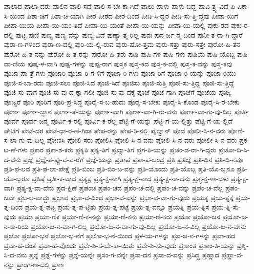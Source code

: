 {ಪಾಲಾದ
ಪಾಲಾ-ದರು
ಪಾಲಿನ
ಪಾಲಿ-ಸದೆ
ಪಾಲಿ-ಸ-ಬೇ-ಕಾ-ಗಿದೆ
ಪಾಲು
ಪಾಳು
ಪಾಳು-ಬಿದ್ದ
ಪಾವಿ-ತ್ರ್ಯ-ವಿದೆ
ಪಿ
ಪಿಕಾ-ಸಿ-ಯಿಂದ
ಪಿಶಾ-ಚಿಗೆ
ಪಿಶಾ-ಚಿ-ಯಾಗಿ
ಪೀಠ
ಪೀಠದ
ಪೀಠ-ದಿಂದ
ಪೀಡಿ-ಸಿ-ದ್ದರ
ಪೀಡಿ-ಸು-ತ್ತಿ-ದ್ದವು
ಪೀಪಾ-ಯಿಗೆ
ಪೀಪಾ-ಯಿಯ
ಪೀಪಾ-ಯಿ-ಯಂ-ತಿದೆ
ಪೀಪಾ-ಯಿ-ಯಂತೆ
ಪೀಪಾ-ಯಿ-ಯನ್ನು
ಪೀಪಾ-ಯಿ-ಯಲ್ಲಿ
ಪುಕು-ರದ
ಪುಕು-ರ-ದಲ್ಲಿ
ಪುಟ್ಟ
ಪುಣಿ
ಪುಣ್ಯ
ಪುಣ್ಯ-ವನ್ನು
ಪುಣ್ಯ-ವಿದೆ
ಪುಣ್ಯಾ-ತ್ಮ-ರಿಲ್ಲ
ಪುನಃ
ಪುನ-ರ್ಜ-ನ್ಮ-ದಿಂದ
ಪುನೀ-ತ-ರಾ-ಗಿ-ದ್ದಾರೆ
ಪುರಾ-ಣ-ಗಳಿಂದ
ಪುರಾ-ಣ-ದಲ್ಲಿ
ಪುರಿ-ಯ-ಲ್ಲಿ-ರುವ
ಪುರು-ಷೋ-ತ್ತಮ
ಪುರು-ಸತ್ತು
ಪುರು-ಸತ್ತೇ
ಪುರೋ-ಹಿ-ತನ
ಪುರೋ-ಹಿ-ತ-ನನ್ನು
ಪುರೋ-ಹಿ-ತ-ರನ್ನು
ಪುರೋ-ಹಿ-ತರು
ಪುಷಿ
ಪುಷಿ-ಗಳ
ಪುಷಿ-ಗಳು
ಪುಷಿಯ
ಪುಷಿ-ಯೊಬ್ಬ
ಪುಷಿ-ವಾ-ಣಿಯ
ಪುಷ್ಕ-ಳ-ವಾಗಿ
ಪುಷ್ಪ-ಗಳನ್ನು
ಪುಷ್ಪ-ರಾಗ
ಪುಸ್ತಕ
ಪುಸ್ತ-ಕದ
ಪುಸ್ತ-ಕ-ದಲ್ಲಿ
ಪುಸ್ತ-ಕ-ವನ್ನು
ಪುಸ್ತ-ಕವು
ಪೂಜಾ-ಪಾ-ತ್ರೆ-ಗಳು
ಪೂಜಾರಿ
ಪೂಜಾ-ರಿ-ಗ-ಳಿಗೆ
ಪೂಜಾ-ರಿ-ಗಳು
ಪೂಜಾ-ರಿಗೆ
ಪೂಜಾ-ರಿ-ಯನ್ನು
ಪೂಜಾ-ರಿಯು
ಪೂಜಿ-ಸ-ಬಾ-ರದು
ಪೂಜಿ-ಸಲು
ಪೂಜಿ-ಸಿದ
ಪೂಜಿ-ಸಿದೆ
ಪೂಜಿಸು
ಪೂಜಿ-ಸುತ್ತಿ
ಪೂಜಿ-ಸು-ತ್ತಿದ್ದ
ಪೂಜಿ-ಸು-ತ್ತಿದ್ದೆ
ಪೂಜಿ-ಸು-ವಾಗ
ಪೂಜಿ-ಸು-ವು-ದ-ಕ್ಕಾ-ಗಲೀ
ಪೂಜಿ-ಸು-ವು-ದಕ್ಕೆ
ಪೂಜೆ
ಪೂಜೆ-ಗಾಗಿ
ಪೂಜೆಗೆ
ಪೂಜೆಯ
ಪೂಜ್ಯ
ಪೂಜ್ಯರೆ
ಪೂರಿ
ಪೂರಿಗೆ
ಪೂರಿ-ಪ್ರ-ಸಿದ್ಧ
ಪೂರೈ-ಸ-ಬ-ಹುದು
ಪೂರೈ-ಸ-ಬೇಕು
ಪೂರೈ-ಸಿ-ಕೊಂಡ
ಪೂರೈ-ಸಿ-ರ-ಬೇಕು
ಪೂರ್ಣ
ಪೂರ್ಣ-ಜ್ಞಾನ
ಪೂರ್ಣ-ತೆ-ಯನ್ನು
ಪೂರ್ಣ-ವಾಗಿ
ಪೂರ್ಣ-ವಾ-ಗಿ-ರು-ವನು
ಪೂರ್ಣ-ವಾ-ಗು-ವು-ದಿಲ್ಲ
ಪೂರ್ತಿ
ಪೂರ್ವ
ಪೂರ್ವ-ಜನ್ಮ
ಪೂರ್ವಿ-ಕ-ರಲ್ಲಿ
ಪೂರ್ವಿ-ಕ-ರೆಲ್ಲ
ಪೆಟ್ಟಿ-ಗೆ-ಯನ್ನು
ಪೆಟ್ಟಿ-ಗೆ-ಯ-ಲ್ಲಿತ್ತು
ಪೆಟ್ಟಿ-ಗೆ-ಯ-ಲ್ಲಿದೆ
ಪೇಟೆಗೆ
ಪೇಟೆ-ದರ
ಪೇಟೆ-ಧಾ-ರ-ಣೆ-ಗಿಂತ
ಪೇಪ-ರನ್ನು
ಪೇಪ-ರಿ-ನಲ್ಲಿ
ಪೈಲ್ವಾನ್
ಪೊದೆ
ಪೊಲೀ-ಸಿ-ನ-ವರು
ಪೋಣಿ-ಸ-ಲಾ-ಗು-ವು-ದಿಲ್ಲ
ಪೋಣಿಸಿ
ಪೋಲಿ-ಸರು
ಪೋಲಿಸಿ
ಪೋಲಿ-ಸಿ-ನ-ವನು
ಪೋಲಿ-ಸಿ-ನ-ವರು
ಪೋಲೀ-ಸಿ-ನ-ವರು
ಪ್ರಕ-ಟ-ಣೆ-ಗಳು
ಪ್ರಕಾರ
ಪ್ರಕಾ-ಶ-ಕರು
ಪ್ರಕೃತಿ
ಪ್ರಕೃ-ತಿಗೆ
ಪ್ರಖ್ಯಾ-ತಿಗೆ
ಪ್ರಗ-ತಿ-ಯನ್ನು
ಪ್ರಚಂ-ಡ-ರಾ-ಗಿ-ದ್ದರು
ಪ್ರಚೋ-ದಿ-ಸಿ-ದ-ವನು
ಪ್ರಜ್ಞೆ
ಪ್ರಜ್ಞೆ-ತ-ಪ್ಪು-ವ-ವ-ರೆಗೆ
ಪ್ರಜ್ಞೆ-ಯನ್ನು
ಪ್ರತಾಪ
ಪ್ರತಾ-ಪ-ಚಂದ್ರ
ಪ್ರತಿ
ಪ್ರತಿಜ್ಞೆ
ಪ್ರತಿ-ದಿನ
ಪ್ರತಿ-ದಿ-ನವೂ
ಪ್ರತಿ-ಫ-ಲವ
ಪ್ರತಿ-ಫ-ಲಾ-ಪೇಕ್ಷೆ
ಪ್ರತಿ-ಬಿಂಬ
ಪ್ರತಿ-ಬಿಂ-ಬ-ವನ್ನು
ಪ್ರತಿ-ಯೊಂದು
ಪ್ರತಿ-ಯೊಬ್ಬ
ಪ್ರತಿ-ಯೊ-ಬ್ಬನೂ
ಪ್ರತಿ-ಯೊ-ಬ್ಬರೂ
ಪ್ರತಿಷ್ಠೆ
ಪ್ರತೀ-ಕ-ವಾದ
ಪ್ರತ್ಯಕ್ಷ
ಪ್ರತ್ಯ-ಕ್ಷ-ನಾಗಿ
ಪ್ರತ್ಯ-ಕ್ಷ-ನಾದ
ಪ್ರತ್ಯ-ಕ್ಷ-ನಾ-ದನು
ಪ್ರತ್ಯ-ಕ್ಷ-ಳಾ-ದಳು
ಪ್ರತ್ಯ-ಕ್ಷ-ವಾಗಿ
ಪ್ರತ್ಯ-ಕ್ಷ-ವಾ-ದೆನು
ಪ್ರದ-ಕ್ಷಿಣೆ
ಪ್ರಪಂಚ
ಪ್ರಪಂ-ಚದ
ಪ್ರಪಂ-ಚ-ದಲ್ಲಿ
ಪ್ರಪಂ-ಚ-ವನ್ನು
ಪ್ರಪಂ-ಚ-ವೆಲ್ಲ
ಪ್ರಪಂ-ಚವೇ
ಪ್ರಬ-ಲ-ವಾದ್ದು
ಪ್ರಭಾವ
ಪ್ರಭಾ-ವ-ದಿಂದ
ಪ್ರಭಾ-ವ-ವನ್ನು
ಪ್ರಭಾ-ವ-ವಾ-ಗು-ವುದು
ಪ್ರಯತ್ನ
ಪ್ರಯ-ತ್ನಕ್ಕೆ
ಪ್ರಯ-ತ್ನ-ದಿಂದ
ಪ್ರಯ-ತ್ನ-ಪಟ್ಟ
ಪ್ರಯ-ತ್ನ-ಪ-ಟ್ಟಿತು
ಪ್ರಯ-ತ್ನ-ಪಟ್ಟೆ
ಪ್ರಯ-ತ್ನ-ವನ್ನೂ
ಪ್ರಯತ್ನಿ
ಪ್ರಯ-ತ್ನಿಸ
ಪ್ರಯ-ತ್ನಿ-ಸು-ವುದು
ಪ್ರಯಾ
ಪ್ರಯಾ-ಣಿಕ
ಪ್ರಯಾ-ಣಿ-ಕ-ನನ್ನು
ಪ್ರಯಾ-ಣಿ-ಕನು
ಪ್ರಯಾ-ಣಿ-ಕರು
ಪ್ರಯೋ
ಪ್ರಯೋ-ಜನ
ಪ್ರಯೋ-ಜ-ನ-ಕಾ-ರಿಯ
ಪ್ರಯೋ-ಜ-ನ-ವಾ-ಗ-ಲಿಲ್ಲ
ಪ್ರಯೋ-ಜ-ನ-ವಾ-ಗು-ವು-ದಿಲ್ಲ
ಪ್ರಯೋ-ಜ-ನ-ವಿಲ್ಲ
ಪ್ರಯೋ-ಜ-ನ-ವೇನು
ಪ್ರಲೋ
ಪ್ರಲೋ-ಭನೆ
ಪ್ರಲೋ-ಭ-ನೆಗೆ
ಪ್ರಲೋ-ಭ-ನೆ-ಯಿಂದ
ಪ್ರಳ-ಯ-ಗಳನ್ನು
ಪ್ರವ-ಚ-ನ-ಗಳನ್ನು
ಪ್ರವಾ-ಹದ
ಪ್ರವಾ-ಹ-ದಂತೆ
ಪ್ರವಾ-ಹ-ವೊಂದು
ಪ್ರವೇ-ಶಿ-ಸ-ಬೇ-ಕಾ-ಯಿತು
ಪ್ರವೇ-ಶಿ-ಸು-ವುದು
ಪ್ರಶಾಂತ
ಪ್ರಶಾಂ-ತಿ-ಯನ್ನು
ಪ್ರಶ್ನಿ-ಸಿ-ದ-ವನು
ಪ್ರಶ್ನೆ
ಪ್ರಶ್ನೆ-ಗಳನ್ನು
ಪ್ರಶ್ನೆ-ಯನ್ನೇ
ಪ್ರಸಂ-ಗ-ವನ್ನೇ
ಪ್ರಸಾ-ದನ
ಪ್ರಸಾ-ದ-ವನ್ನು
ಪ್ರಸಿದ್ಧ
ಪ್ರಹ್ಲಾದ
ಪ್ರಹ್ಲಾ-ದ-ನನ್ನು
ಪ್ರಾಂಗ-ಣ-ದಲ್ಲಿ
ಪ್ರಾಣ
}
